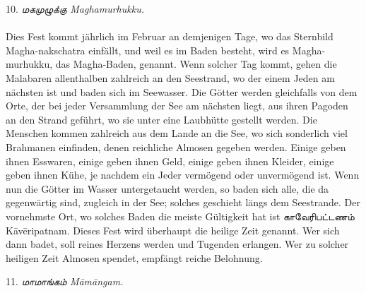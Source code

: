 \documentclass{article}
\newcommand{\TamilText}[1]{\texttamil{#1}}
\newcommand{\tam}[1]{\TamilText{#1}}
\begin{document}
\begin{center}
10. \emph{\tam{மகமுழுக்கு} Maghamurhukku.}
\end{center}
\paragraph{}
Dies Fest kommt jährlich im Februar an demjenigen Tage, wo das Sternbild Magha-nakschatra einfällt, und weil es im Baden besteht, wird es Magha-murhukku, das Magha-Baden, genannt. Wenn solcher Tag kommt, gehen die Malabaren allenthalben zahlreich an den Seestrand, wo der einem Jeden am nächsten ist und baden sich im Seewasser. Die Götter werden gleichfalls von dem Orte, der bei jeder Versammlung der See am nächsten liegt, aus ihren Pagoden an den Strand geführt, wo sie unter eine Laubhütte gestellt werden. Die Menschen kommen zahlreich aus dem Lande an die See, wo sich sonderlich viel Brahmanen einfinden, denen reichliche Almosen gegeben werden. Einige geben ihnen Esswaren, einige geben ihnen Geld, einige geben ihnen Kleider, einige geben ihnen Kühe, je nachdem ein Jeder vermögend oder unvermögend ist. Wenn nun die Götter im Wasser untergetaucht werden, so baden sich alle, die da gegenwärtig sind, zugleich in der See; solches geschieht längs dem Seestrande. Der vornehmste Ort, wo solches Baden die meiste Gültigkeit hat ist \tam{காவேரிபட்டணம்} K\={a}v\={e}ripatnam. Dieses Fest wird überhaupt die heilige Zeit genannt. Wer sich dann badet, soll reines Herzens werden und Tugenden erlangen. Wer zu solcher heiligen Zeit Almosen spendet, empfängt reiche Belohnung.

\begin{center}
11. \emph{\tam{மாமாங்கம்} M\={a}m\={a}ngam.}
\end{center}
\end{document}
